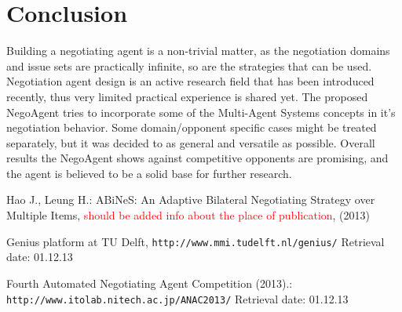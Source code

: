 \documentclass[html]{report}    %
\begin{document}
\section{Conclusion}
Building a negotiating agent is a non-trivial matter, as the negotiation domains and issue sets are practically infinite, so are the strategies that can be used. Negotiation agent design is an active research field that has been introduced recently, thus very limited practical experience is shared yet. The proposed NegoAgent tries to incorporate some of the Multi-Agent Systems concepts in it's negotiation behavior. Some domain/opponent specific cases might be treated separately, but it was decided to as general and versatile as possible. Overall results the NegoAgent shows against competitive opponents are promising, and the agent is believed to be a solid base for further research. 

\begin{thebibliography}{}

Hao J., Leung H.:
ABiNeS: An Adaptive Bilateral Negotiating Strategy over Multiple Items,
\textcolor{red}{should be added info about the place of publication}, (2013)

Genius platform at TU Delft,
\texttt{http://www.mmi.tudelft.nl/genius/} Retrieval date: 01.12.13

Fourth Automated Negotiating Agent Competition (2013).:
\texttt{http://www.itolab.nitech.ac.jp/ANAC2013/} Retrieval date: 01.12.13

\end{thebibliography}
\end{document}
